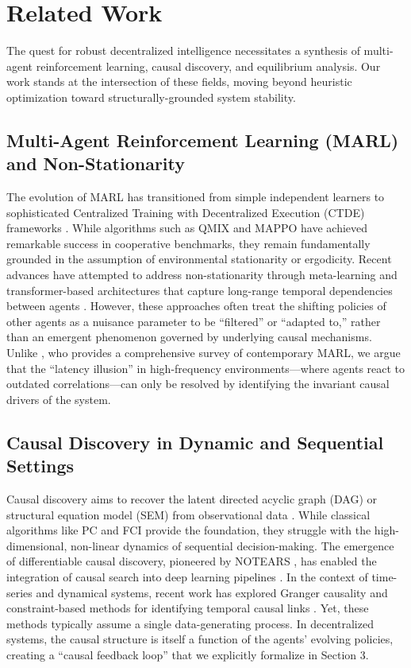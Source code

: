 \section{Related Work}

The quest for robust decentralized intelligence necessitates a synthesis of multi-agent reinforcement learning, causal discovery, and equilibrium analysis. Our work stands at the intersection of these fields, moving beyond heuristic optimization toward structurally-grounded system stability.

\subsection{Multi-Agent Reinforcement Learning (MARL) and Non-Stationarity}
The evolution of MARL has transitioned from simple independent learners to sophisticated Centralized Training with Decentralized Execution (CTDE) frameworks \cite{lowe2017multi, foerster2018counterfactual}. While algorithms such as QMIX \cite{rashid2018qmix} and MAPPO \cite{yu2022surprising} have achieved remarkable success in cooperative benchmarks, they remain fundamentally grounded in the assumption of environmental stationarity or ergodicity. Recent advances have attempted to address non-stationarity through meta-learning \cite{wang2023model} and transformer-based architectures that capture long-range temporal dependencies between agents \cite{wen2022multi, hu2023transformer}. However, these approaches often treat the shifting policies of other agents as a nuisance parameter to be ``filtered'' or ``adapted to,'' rather than an emergent phenomenon governed by underlying causal mechanisms. Unlike \cite{gronauer2022multi}, who provides a comprehensive survey of contemporary MARL, we argue that the ``latency illusion'' in high-frequency environments—where agents react to outdated correlations—can only be resolved by identifying the invariant causal drivers of the system.

\subsection{Causal Discovery in Dynamic and Sequential Settings}
Causal discovery aims to recover the latent directed acyclic graph (DAG) or structural equation model (SEM) from observational data \cite{pearl2009causality, spirtes2000causation}. While classical algorithms like PC and FCI \cite{spirtes2000causation} provide the foundation, they struggle with the high-dimensional, non-linear dynamics of sequential decision-making. The emergence of differentiable causal discovery, pioneered by NOTEARS \cite{zheng2018dag}, has enabled the integration of causal search into deep learning pipelines \cite{ng2022masked, li2024differentiable}. In the context of time-series and dynamical systems, recent work has explored Granger causality and constraint-based methods for identifying temporal causal links \cite{khanna2020economy, runge2023inferring}. Yet, these methods typically assume a single data-generating process. In decentralized systems, the causal structure is itself a function of the agents' evolving policies, creating a ``causal feedback loop'' that we explicitly formalize in Section 3.

